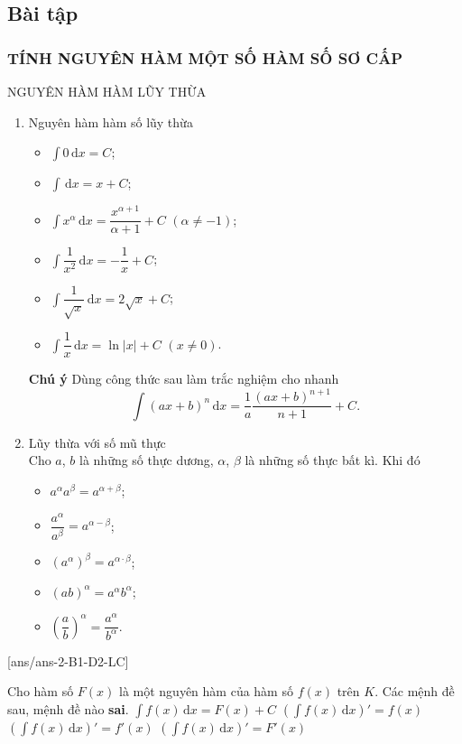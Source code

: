 \subsection{Bài tập}
\subsubsection{TÍNH NGUYÊN HÀM MỘT SỐ HÀM SỐ SƠ CẤP}
\begin{dang}{NGUYÊN HÀM HÀM LŨY THỪA}
	\begin{enumerate}[1.]
		\item Nguyên hàm hàm số lũy thừa
		\begin{itemize}
			\item $\displaystyle\int{0\mathrm{\,d}x}=C$;
			\item $\displaystyle\int{\mathrm{\,d}x}=x+C$;
			\item $\displaystyle\int{x^\alpha\mathrm{\,d}x}=\dfrac{x^{\alpha+1}}{\alpha+1}+C$ $(\alpha\ne-1)$;
			\item $\displaystyle\int{\dfrac{1}{x^2}\mathrm{\,d}x}=-\dfrac{1}{x}+C$;
			\item $\displaystyle\int{\dfrac{1}{\sqrt{x}}\mathrm{\,d}x}=2\sqrt{x}+C$;
			\item $\displaystyle\int{\dfrac{1}{x}\mathrm{\,d}x}=\ln|x|+C$ $(x\ne0)$.
		\end{itemize}
\begin{note}\textbf{Chú ý}
	Dùng công thức sau làm trắc nghiệm cho nhanh $$\displaystyle\int(ax+b)^n\mathrm{\,d}x=\dfrac{1}{a}\dfrac{(ax+b)^{n+1}}{n+1}+C.$$
\end{note}
	
		\item Lũy thừa với số mũ thực\\
	Cho $a$, $b$ là những số thực dương, $\alpha$, $\beta$ là những số thực bất kì. Khi đó
	\begin{itemize}
		\item $a^{\alpha}a^{\beta}=a^{\alpha +\beta}$;
		\item $\dfrac{a^{\alpha}}{a^{\beta}}=a^{\alpha -\beta}$;
		\item $(a^{\alpha})^{\beta}=a^{\alpha\cdot \beta}$;
		\item $(ab)^{\alpha}=a^{\alpha}b^{\alpha}$;
		\item $\left(\dfrac{a}{b}\right)^{\alpha}=\dfrac{a^{\alpha}}{b^{\alpha}}$.
	\end{itemize}
	\end{enumerate}
\end{dang}
\TN
{}[ans/ans-2-B1-D2-LC]
\begin{ex}%
	Cho hàm số $F(x)$ là một nguyên hàm của hàm số $f(x)$ trên $K$. Các mệnh đề sau, mệnh đề nào \textbf{sai}.
	\choice
	{$\displaystyle\int{f(x)\mathrm{\,d}x=}F(x)+C$}
	{$\displaystyle{\left(\displaystyle\int{f(x)\mathrm{\,d}x}\right)'}=f(x)$}
	{\True $\displaystyle{\left(\displaystyle\int{f(x)\mathrm{\,d}x}\right)'}=f'(x)$}
	{$\displaystyle{\left(\displaystyle\int{f(x)\mathrm{\,d}x}\right)'}=F'(x)$}
\end{ex}

